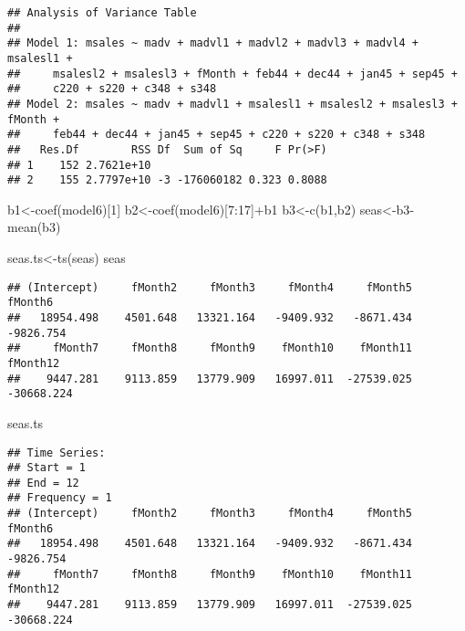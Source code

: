 \documentclass[
]{article}
\newenvironment{Shaded}{\begin{snugshade}}{\end{snugshade}}
\newcommand{\DecValTok}[1]{\textcolor[rgb]{0.00,0.00,0.81}{#1}}
\newcommand{\FunctionTok}[1]{\textcolor[rgb]{0.00,0.00,0.00}{#1}}
\newcommand{\NormalTok}[1]{#1}
\newcommand{\OtherTok}[1]{\textcolor[rgb]{0.56,0.35,0.01}{#1}}
\newcommand{\SpecialCharTok}[1]{\textcolor[rgb]{0.00,0.00,0.00}{#1}}
\begin{document}
\begin{verbatim}
## Analysis of Variance Table
## 
## Model 1: msales ~ madv + madvl1 + madvl2 + madvl3 + madvl4 + msalesl1 + 
##     msalesl2 + msalesl3 + fMonth + feb44 + dec44 + jan45 + sep45 + 
##     c220 + s220 + c348 + s348
## Model 2: msales ~ madv + madvl1 + msalesl1 + msalesl2 + msalesl3 + fMonth + 
##     feb44 + dec44 + jan45 + sep45 + c220 + s220 + c348 + s348
##   Res.Df        RSS Df  Sum of Sq     F Pr(>F)
## 1    152 2.7621e+10                           
## 2    155 2.7797e+10 -3 -176060182 0.323 0.8088
\end{verbatim}

\begin{Shaded}
\begin{Highlighting}[]
\NormalTok{b1}\OtherTok{\textless{}{-}}\FunctionTok{coef}\NormalTok{(model6)[}\DecValTok{1}\NormalTok{]}
\NormalTok{b2}\OtherTok{\textless{}{-}}\FunctionTok{coef}\NormalTok{(model6)[}\DecValTok{7}\SpecialCharTok{:}\DecValTok{17}\NormalTok{]}\SpecialCharTok{+}\NormalTok{b1}
\NormalTok{b3}\OtherTok{\textless{}{-}}\FunctionTok{c}\NormalTok{(b1,b2)}
\NormalTok{seas}\OtherTok{\textless{}{-}}\NormalTok{b3}\SpecialCharTok{{-}}\FunctionTok{mean}\NormalTok{(b3)}

\NormalTok{seas.ts}\OtherTok{\textless{}{-}}\FunctionTok{ts}\NormalTok{(seas)}
\NormalTok{seas}
\end{Highlighting}
\end{Shaded}

\begin{verbatim}
## (Intercept)     fMonth2     fMonth3     fMonth4     fMonth5     fMonth6 
##   18954.498    4501.648   13321.164   -9409.932   -8671.434   -9826.754 
##     fMonth7     fMonth8     fMonth9    fMonth10    fMonth11    fMonth12 
##    9447.281    9113.859   13779.909   16997.011  -27539.025  -30668.224
\end{verbatim}

\begin{Shaded}
\begin{Highlighting}[]
\NormalTok{seas.ts}
\end{Highlighting}
\end{Shaded}

\begin{verbatim}
## Time Series:
## Start = 1 
## End = 12 
## Frequency = 1 
## (Intercept)     fMonth2     fMonth3     fMonth4     fMonth5     fMonth6 
##   18954.498    4501.648   13321.164   -9409.932   -8671.434   -9826.754 
##     fMonth7     fMonth8     fMonth9    fMonth10    fMonth11    fMonth12 
##    9447.281    9113.859   13779.909   16997.011  -27539.025  -30668.224
\end{verbatim}
\end{document}
